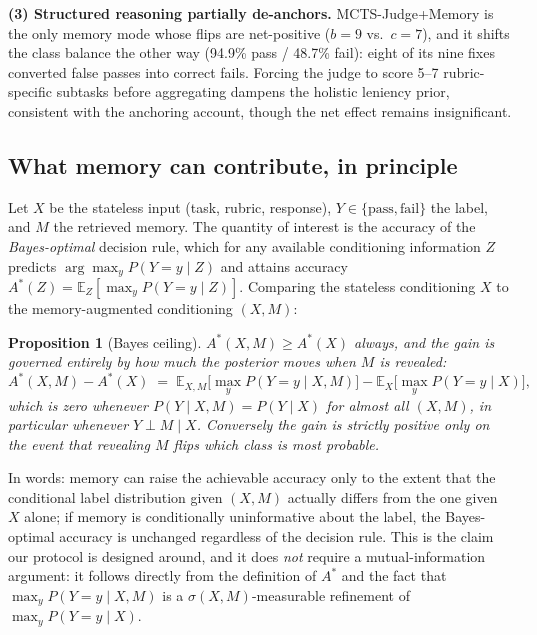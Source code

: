 \documentclass[11pt]{article}
\newtheorem{proposition}{Proposition}
\begin{document}
\textbf{(3) Structured reasoning partially de-anchors.} MCTS-Judge+Memory is the only memory mode whose flips are net-positive ($b{=}9$ vs.\ $c{=}7$), and it shifts the class balance the other way (94.9\% pass / 48.7\% fail): eight of its nine fixes converted false passes into correct fails. Forcing the judge to score 5--7 rubric-specific subtasks before aggregating dampens the holistic leniency prior, consistent with the anchoring account, though the net effect remains insignificant.

\subsection{What memory can contribute, in principle}
\label{sec:theory}

Let $X$ be the stateless input (task, rubric, response), $Y \in \{\text{pass},\text{fail}\}$ the label, and $M$ the retrieved memory. The quantity of interest is the accuracy of the \emph{Bayes-optimal} decision rule, which for any available conditioning information $Z$ predicts $\arg\max_y P(Y{=}y \mid Z)$ and attains accuracy $A^*(Z) = \mathbb{E}_Z\!\left[\max_y P(Y{=}y \mid Z)\right]$. Comparing the stateless conditioning $X$ to the memory-augmented conditioning $(X,M)$:

\begin{proposition}[Bayes ceiling]
\label{prop:bayes}
$A^*(X,M) \ge A^*(X)$ always, and the gain is governed entirely by how much the posterior moves when $M$ is revealed:
\[
A^*(X,M) - A^*(X) \;=\; \mathbb{E}_{X,M}\!\big[\max_y P(Y{=}y\mid X,M)\big] - \mathbb{E}_{X}\!\big[\max_y P(Y{=}y\mid X)\big],
\]
which is zero whenever $P(Y\mid X,M)=P(Y\mid X)$ for almost all $(X,M)$, in particular whenever $Y \perp M \mid X$. Conversely the gain is strictly positive only on the event that revealing $M$ flips which class is most probable.
\end{proposition}

In words: memory can raise the achievable accuracy only to the extent that the conditional label distribution given $(X,M)$ actually differs from the one given $X$ alone; if memory is conditionally uninformative about the label, the Bayes-optimal accuracy is unchanged regardless of the decision rule. This is the claim our protocol is designed around, and it does \emph{not} require a mutual-information argument: it follows directly from the definition of $A^*$ and the fact that $\max_y P(Y{=}y\mid X,M)$ is a $\sigma(X,M)$-measurable refinement of $\max_y P(Y{=}y\mid X)$.
\end{document}
